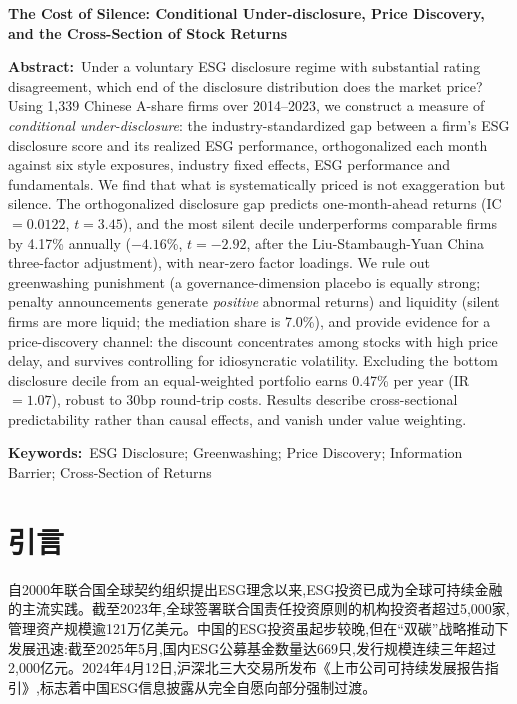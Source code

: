 \documentclass[UTF8, a4paper, fontset=fandol, zihao=-4]{ctexart}
\begin{document}
\vspace{6pt}
\begin{center}
\begin{minipage}{0.92\textwidth}
\noindent\textbf{The Cost of Silence: Conditional Under-disclosure, Price Discovery, and the Cross-Section of Stock Returns}

\vspace{4pt}
\noindent\textbf{Abstract:}~Under a voluntary ESG disclosure regime with substantial rating disagreement, which end of the disclosure distribution does the market price? Using 1{,}339 Chinese A-share firms over 2014--2023, we construct a measure of \emph{conditional under-disclosure}: the industry-standardized gap between a firm's ESG disclosure score and its realized ESG performance, orthogonalized each month against six style exposures, industry fixed effects, ESG performance and fundamentals. We find that what is systematically priced is not exaggeration but silence. The orthogonalized disclosure gap predicts one-month-ahead returns (IC${}=0.0122$, $t=3.45$), and the most silent decile underperforms comparable firms by 4.17\% annually ($-4.16$\%, $t=-2.92$, after the Liu-Stambaugh-Yuan China three-factor adjustment), with near-zero factor loadings. We rule out greenwashing punishment (a governance-dimension placebo is equally strong; penalty announcements generate \emph{positive} abnormal returns) and liquidity (silent firms are more liquid; the mediation share is 7.0\%), and provide evidence for a price-discovery channel: the discount concentrates among stocks with high price delay, and survives controlling for idiosyncratic volatility. Excluding the bottom disclosure decile from an equal-weighted portfolio earns 0.47\% per year (IR${}=1.07$), robust to 30bp round-trip costs. Results describe cross-sectional predictability rather than causal effects, and vanish under value weighting.

\vspace{4pt}
\noindent\textbf{Keywords:}~ESG Disclosure; Greenwashing; Price Discovery; Information Barrier; Cross-Section of Returns
\end{minipage}
\end{center}

\newpage
\setcounter{page}{1}

\section{引言}

自2000年联合国全球契约组织提出ESG理念以来,ESG投资已成为全球可持续金融的主流实践。截至2023年,全球签署联合国责任投资原则的机构投资者超过5{,}000家,管理资产规模逾121万亿美元。中国的ESG投资虽起步较晚,但在“双碳”战略推动下发展迅速:截至2025年5月,国内ESG公募基金数量达669只,发行规模连续三年超过2{,}000亿元。2024年4月12日,沪深北三大交易所发布《上市公司可持续发展报告指引》,标志着中国ESG信息披露从完全自愿向部分强制过渡。
\end{document}
